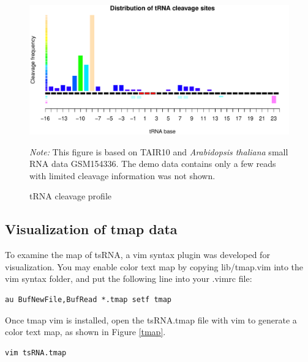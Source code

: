 \documentclass[11pt, a4paper]{article}
\begin{document}
\begin{figure}[htbp]
\begin{center}
\includegraphics[width=13cm]{cleavage_profile.pdf}
\caption{tRNA cleavage profile}
\label{cleavage}
\end{center}
\emph{Note:} This figure is based on TAIR10 and \textit{Arabidopsis thaliana} small RNA data GSM154336. The demo data contains only a few reads with limited cleavage information was not shown.
\end{figure}

\subsection{Visualization of tmap data}

To examine the map of tsRNA, a vim syntax plugin was developed for visualization. You may enable color text map by copying lib/tmap.vim into the vim syntax folder, and put the following line into your .vimrc file:

{\footnotesize \begin{tcolorbox}[colback=blue!5!white,colframe=pink!75!black,title=Set filetype tmap in vim]
\begin{verbatim}
au BufNewFile,BufRead *.tmap setf tmap
\end{verbatim}
\end{tcolorbox}}

Once tmap vim is installed, open the tsRNA.tmap file with vim to generate a color text map, as shown in Figure \ref{tmap}.

{\footnotesize \begin{tcolorbox}[colback=blue!5!white,colframe=pink!75!black,title=Visualization tsRNA.tmap]
\begin{verbatim}
vim tsRNA.tmap
\end{verbatim}
\end{tcolorbox}}
\end{document}
